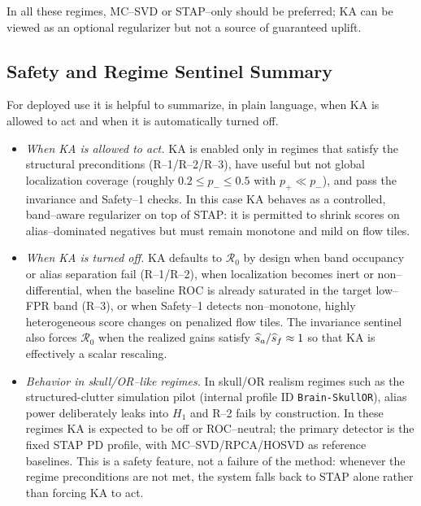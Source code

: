 In all these regimes, MC--SVD or STAP--only should be preferred; KA can be viewed as an optional regularizer but not a source of guaranteed uplift.

\subsection{Safety and Regime Sentinel Summary}

For deployed use it is helpful to summarize, in plain language, when KA is allowed to act and when it is automatically turned off.

\begin{itemize}[nosep]
  \item \emph{When KA is allowed to act.} KA is enabled only in regimes that satisfy the structural preconditions (R--1/R--2/R--3), have useful but not global localization coverage (roughly $0.2\le p_-\le 0.5$ with $p_+\ll p_-$), and pass the invariance and Safety--1 checks. In this case KA behaves as a controlled, band--aware regularizer on top of STAP: it is permitted to shrink scores on alias--dominated negatives but must remain monotone and mild on flow tiles.
  \item \emph{When KA is turned off.} KA defaults to $\mathcal{R}_0$ by design when band occupancy or alias separation fail (R--1/R--2), when localization becomes inert or non--differential, when the baseline ROC is already saturated in the target low--FPR band (R--3), or when Safety--1 detects non--monotone, highly heterogeneous score changes on penalized flow tiles. The invariance sentinel also forces $\mathcal{R}_0$ when the realized gains satisfy $\widehat s_a/\widehat s_f\approx 1$ so that KA is effectively a scalar rescaling.
  \item \emph{Behavior in skull/OR--like regimes.} In skull/OR realism regimes such as the structured-clutter simulation pilot (internal profile ID \texttt{Brain-SkullOR}), alias power deliberately leaks into $H_1$ and R--2 fails by construction. In these regimes KA is expected to be off or ROC--neutral; the primary detector is the fixed STAP PD profile, with MC--SVD/\allowbreak RPCA/\allowbreak HOSVD as reference baselines. This is a safety feature, not a failure of the method: whenever the regime preconditions are not met, the system falls back to STAP alone rather than forcing KA to act.
\end{itemize}
